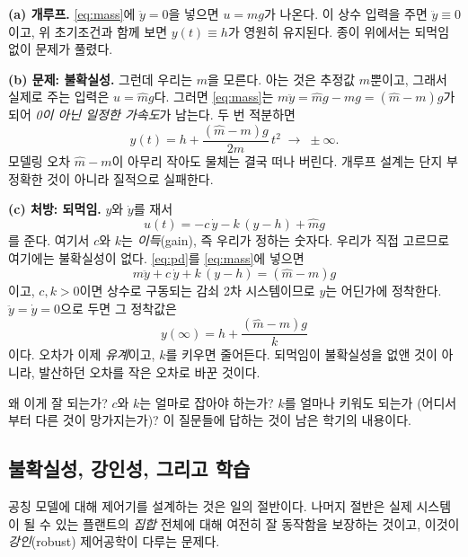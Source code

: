 \documentclass[11pt]{article}
\begin{document}
\smallskip
\noindent\textbf{(a) 개루프.} \eqref{eq:mass}에 $\ddot y=0$을 넣으면 $u=mg$가
나온다. 이 상수 입력을 주면 $\ddot y \equiv 0$이고, 위 초기조건과 함께 보면
$y(t)\equiv h$가 영원히 유지된다. 종이 위에서는 되먹임 없이 문제가 풀렸다.

\smallskip
\noindent\textbf{(b) 문제: 불확실성.} 그런데 우리는 $m$을 모른다. 아는 것은
추정값 $\hat m$뿐이고, 그래서 실제로 주는 입력은 $u=\hat m g$다. 그러면
\eqref{eq:mass}는 $m\ddot y = \hat m g - mg = (\hat m - m)g$가 되어 \emph{0이
아닌 일정한 가속도}가 남는다. 두 번 적분하면
\[
   y(t) = h + \frac{(\hat m-m)g}{2m}\,t^{2}\;\longrightarrow\;\pm\infty .
\]
모델링 오차 $\hat m - m$이 아무리 작아도 물체는 결국 떠나 버린다. 개루프 설계는
단지 부정확한 것이 아니라 질적으로 실패한다.

\smallskip
\noindent\textbf{(c) 처방: 되먹임.} $y$와 $\dot y$를 재서
\begin{equation}\label{eq:pd}
   u(t) = -c\,\dot y - k\,(y-h) + \hat m g
\end{equation}
를 준다. 여기서 $c$와 $k$는 \emph{이득}(gain), 즉 우리가 정하는 숫자다. 우리가
직접 고르므로 여기에는 불확실성이 없다. \eqref{eq:pd}를 \eqref{eq:mass}에 넣으면
\begin{equation}\label{eq:massfb}
   m\ddot y + c\,\dot y + k\,(y-h) = (\hat m-m)g
\end{equation}
이고, $c,k>0$이면 상수로 구동되는 감쇠 2차 시스템이므로 $y$는 어딘가에 정착한다.
$\ddot y=\dot y=0$으로 두면 그 정착값은
\begin{equation}\label{eq:offset}
   y(\infty) = h + \frac{(\hat m - m)g}{k}
\end{equation}
이다. 오차가 이제 \emph{유계}이고, $k$를 키우면 줄어든다. 되먹임이 불확실성을
없앤 것이 아니라, 발산하던 오차를 작은 오차로 바꾼 것이다.

\begin{question}
왜 이게 잘 되는가? $c$와 $k$는 얼마로 잡아야 하는가? $k$를 얼마나 키워도 되는가
(어디서부터 다른 것이 망가지는가)? 이 질문들에 답하는 것이 남은 학기의 내용이다.
\end{question}

\subsection{불확실성, 강인성, 그리고 학습}
공칭 모델에 대해 제어기를 설계하는 것은 일의 절반이다. 나머지 절반은 실제
시스템이 될 수 있는 플랜트의 \emph{집합} 전체에 대해 여전히 잘 동작함을
보장하는 것이고, 이것이 \emph{강인}(robust) 제어공학이 다루는 문제다.
\end{document}
